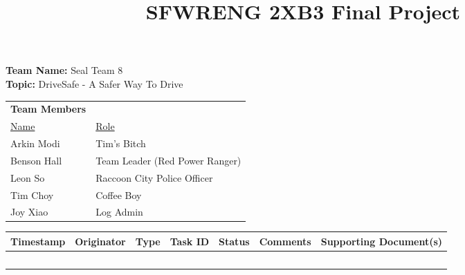 \documentclass[12pt]{article}
\title{SFWRENG 2XB3 Final Project \vspace{-4ex}}
\date{}
\begin{document}
    \maketitle

    \textbf{ Team Name:} Seal Team 8 \\
    \indent \textbf{ Topic:} DriveSafe - A Safer Way To Drive \\

    \begin{tabular}{ll}
        \textbf{Team Members} & ~ \\
        \underline{Name} & \underline{Role} \\
        Arkin Modi  & Tim's Bitch \\
        Benson Hall & Team Leader (Red Power Ranger) \\
        Leon So     & Raccoon City Police Officer\\
        Tim Choy    & Coffee Boy \\
        Joy Xiao    & Log Admin \\
    \end{tabular}
    \newline
    \vspace{1cm}
    \newline
    \begin{tabular}{| l | l | l | p{1cm} | l | l | p{3cm} |}
        \hline
        \textbf{Timestamp} & \textbf{Originator} & \textbf{Type} 
        & \textbf{Task ID} & \textbf{Status} & \textbf{Comments} 
        & \textbf{Supporting Document(s)}\\
        \hline
        ~ & ~ & ~ & ~ & ~ & ~ & ~\\
        \hline
    \end{tabular}
    
\end{document}
